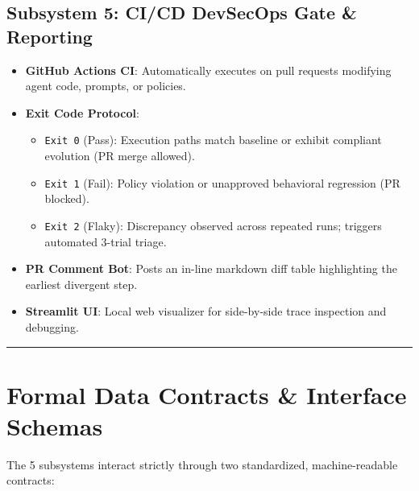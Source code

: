 \documentclass[10pt,a4paper]{article}
\begin{document}
\subsection{Subsystem 5: CI/CD DevSecOps Gate \& Reporting}
\begin{itemize}[leftmargin=1.5em,noitemsep]
    \item \textbf{GitHub Actions CI}: Automatically executes on pull requests modifying agent code, prompts, or policies.
    \item \textbf{Exit Code Protocol}:
      \begin{itemize}[noitemsep]
          \item \texttt{Exit 0} (Pass): Execution paths match baseline or exhibit compliant evolution (PR merge allowed).
          \item \texttt{Exit 1} (Fail): Policy violation or unapproved behavioral regression (PR blocked).
          \item \texttt{Exit 2} (Flaky): Discrepancy observed across repeated runs; triggers automated 3-trial triage.
      \end{itemize}
    \item \textbf{PR Comment Bot}: Posts an in-line markdown diff table highlighting the earliest divergent step.
    \item \textbf{Streamlit UI}: Local web visualizer for side-by-side trace inspection and debugging.
\end{itemize}

\vspace{0.6em}
\hrule
\vspace{0.6em}

\section{Formal Data Contracts & Interface Schemas}

The 5 subsystems interact strictly through two standardized, machine-readable contracts:
\end{document}
